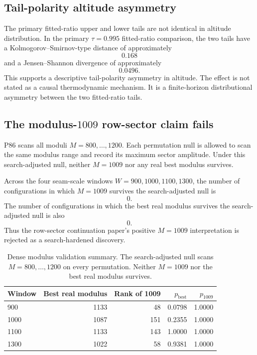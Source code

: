 \documentclass[11pt]{article}
\begin{document}
\subsection{Tail-polarity altitude asymmetry}

The primary fitted-ratio upper and lower tails are not identical in altitude distribution. In the primary \(\tau=0.995\) fitted-ratio comparison, the two tails have a Kolmogorov--Smirnov-type distance of approximately
\[
0.168
\]
and a Jensen--Shannon divergence of approximately
\[
0.0496.
\]
This supports a descriptive tail-polarity asymmetry in altitude. The effect is not stated as a causal thermodynamic mechanism. It is a finite-horizon distributional asymmetry between the two fitted-ratio tails.

\subsection{The modulus-\texorpdfstring{\(1009\)}{1009} row-sector claim fails}

P86 scans all moduli \(M=800,\ldots,1200\). Each permutation null is allowed to scan the same modulus range and record its maximum sector amplitude. Under this search-adjusted null, neither \(M=1009\) nor any real best modulus survives.

Across the four seam-scale windows \(W=900,1000,1100,1300\), the number of configurations in which \(M=1009\) survives the search-adjusted null is
\[
0.
\]
The number of configurations in which the best real modulus survives the search-adjusted null is also
\[
0.
\]
Thus the row-sector continuation paper's positive \(M=1009\) interpretation is rejected as a search-hardened discovery.

\begin{table}[H]
\centering
\small
\begin{tabular}{lrrrr}
\toprule
\textbf{Window} & \textbf{Best real modulus} & \textbf{Rank of 1009} & \textbf{\(p_{\mathrm{best}}\)} & \textbf{\(p_{1009}\)} \\
\midrule
900  & 1133 & 48  & 0.0798 & 1.0000 \\
1000 & 1087 & 151 & 0.2355 & 1.0000 \\
1100 & 1133 & 143 & 1.0000 & 1.0000 \\
1300 & 1022 & 58  & 0.9381 & 1.0000 \\
\bottomrule
\end{tabular}
\caption{Dense modulus validation summary. The search-adjusted null scans \(M=800,\ldots,1200\) on every permutation. Neither \(M=1009\) nor the best real modulus survives.}
\label{tab:modulus-failure}
\end{table}
\end{document}
